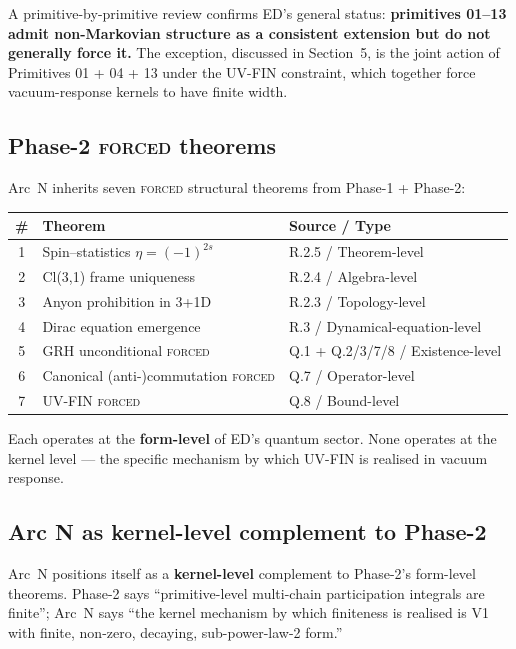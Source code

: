 \documentclass[11pt,a4paper]{article}
\begin{document}
A primitive-by-primitive review confirms ED's general status: \textbf{primitives 01--13 admit non-Markovian structure as a consistent extension but do not generally force it.} The exception, discussed in Section~5, is the joint action of Primitives 01 + 04 + 13 under the UV-FIN constraint, which together force vacuum-response kernels to have finite width.

\subsection{Phase-2 \textsc{forced} theorems}

Arc~N inherits seven \textsc{forced} structural theorems from Phase-1 + Phase-2:
\begin{center}
\begin{tabular}{cll}
\hline
\# & Theorem & Source / Type \\
\hline
1 & Spin--statistics $\eta = (-1)^{2s}$ & R.2.5 / Theorem-level \\
2 & Cl(3,1) frame uniqueness & R.2.4 / Algebra-level \\
3 & Anyon prohibition in 3+1D & R.2.3 / Topology-level \\
4 & Dirac equation emergence & R.3 / Dynamical-equation-level \\
5 & GRH unconditional \textsc{forced} & Q.1 + Q.2/3/7/8 / Existence-level \\
6 & Canonical (anti-)commutation \textsc{forced} & Q.7 / Operator-level \\
7 & UV-FIN \textsc{forced} & Q.8 / Bound-level \\
\hline
\end{tabular}
\end{center}

Each operates at the \textbf{form-level} of ED's quantum sector. None operates at the kernel level --- the specific mechanism by which UV-FIN is realised in vacuum response.

\subsection{Arc N as kernel-level complement to Phase-2}

Arc~N positions itself as a \textbf{kernel-level} complement to Phase-2's form-level theorems. Phase-2 says ``primitive-level multi-chain participation integrals are finite''; Arc~N says ``the kernel mechanism by which finiteness is realised is V1 with finite, non-zero, decaying, sub-power-law-2 form.''
\end{document}
